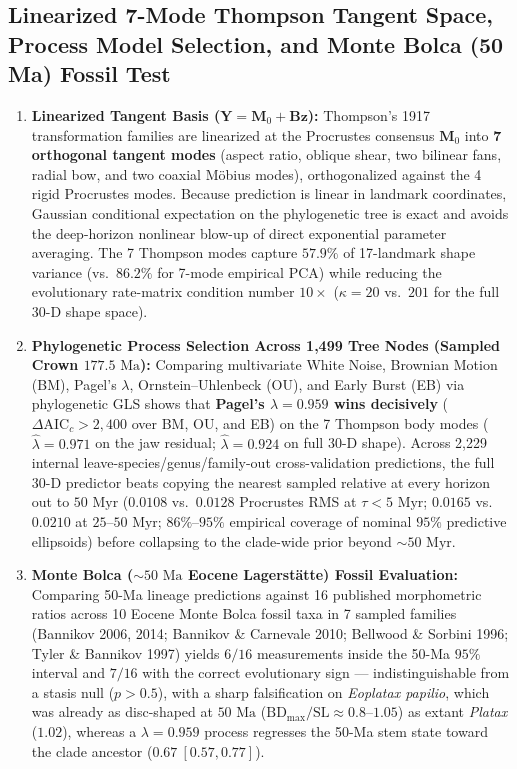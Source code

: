 \documentclass[11pt,a4paper]{article}
\theoremstyle{definition}
\theoremstyle{remark}
\newcommand{\AICc}{\mathrm{AIC}_c}
\begin{document}
\subsection{Linearized 7-Mode Thompson Tangent Space, Process Model Selection, and Monte Bolca (50 Ma) Fossil Test}

\begin{enumerate}
  \item \textbf{Linearized Tangent Basis ($\mathbf{Y} = \mathbf{M}_0 + \mathbf{B}\mathbf{z}$):}
  Thompson's 1917 transformation families are linearized at the Procrustes consensus $\mathbf{M}_0$ into \textbf{7 orthogonal tangent modes} (aspect ratio, oblique shear, two bilinear fans, radial bow, and two coaxial M\"obius modes), orthogonalized against the 4 rigid Procrustes modes. Because prediction is linear in landmark coordinates, Gaussian conditional expectation on the phylogenetic tree is exact and avoids the deep-horizon nonlinear blow-up of direct exponential parameter averaging. The 7 Thompson modes capture $57.9\%$ of 17-landmark shape variance (vs.\ $86.2\%$ for 7-mode empirical PCA) while reducing the evolutionary rate-matrix condition number $10\times$ ($\kappa = 20$ vs.\ $201$ for the full 30-D shape space).
  \item \textbf{Phylogenetic Process Selection Across 1,499 Tree Nodes (Sampled Crown $177.5\text{ Ma}$):}
  Comparing multivariate White Noise, Brownian Motion (BM), Pagel's $\lambda$, Ornstein--Uhlenbeck (OU), and Early Burst (EB) via phylogenetic GLS shows that \textbf{Pagel's $\lambda = 0.959$ wins decisively} ($\Delta\AICc > 2{,}400$ over BM, OU, and EB) on the 7 Thompson body modes ($\hat{\lambda} = 0.971$ on the jaw residual; $\hat{\lambda} = 0.924$ on full 30-D shape). Across 2,229 internal leave-species/genus/family-out cross-validation predictions, the full 30-D predictor beats copying the nearest sampled relative at every horizon out to $50\text{ Myr}$ ($0.0108$ vs.\ $0.0128$ Procrustes RMS at $\tau < 5\text{ Myr}$; $0.0165$ vs.\ $0.0210$ at $25\text{--}50\text{ Myr}$; $86\%\text{--}95\%$ empirical coverage of nominal $95\%$ predictive ellipsoids) before collapsing to the clade-wide prior beyond $\sim 50\text{ Myr}$.
  \item \textbf{Monte Bolca ($\sim 50\text{ Ma}$ Eocene Lagerst\"atte) Fossil Evaluation:}
  Comparing 50-Ma lineage predictions against 16 published morphometric ratios across 10 Eocene Monte Bolca fossil taxa in 7 sampled families (Bannikov 2006, 2014; Bannikov \& Carnevale 2010; Bellwood \& Sorbini 1996; Tyler \& Bannikov 1997) yields $6/16$ measurements inside the 50-Ma $95\%$ interval and $7/16$ with the correct evolutionary sign --- indistinguishable from a stasis null ($p > 0.5$), with a sharp falsification on \emph{Eoplatax papilio}, which was already as disc-shaped at $50\text{ Ma}$ ($\mathrm{BD}_{\max}/\mathrm{SL} \approx 0.8\text{--}1.05$) as extant \emph{Platax} ($1.02$), whereas a $\lambda = 0.959$ process regresses the 50-Ma stem state toward the clade ancestor ($0.67\ [0.57, 0.77]$).
\end{enumerate}
\end{document}
